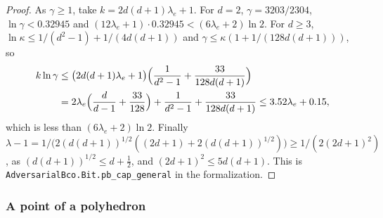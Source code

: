 \documentclass[11pt]{amsart}
\theoremstyle{definition}
\numberwithin{equation}{section}
\begin{document}
\begin{proof}
As $\gamma\ge1$, take $k=2d(d+1)\lambda_e+1$. For $d=2$, $\gamma=3203/2304$, $\ln\gamma<0.32945$ and $(12\lambda_e+1)\cdot0.32945<(6\lambda_e+2)\ln2$. For $d\ge3$, $\ln\kappa\le1/(d^2-1)+1/(4d(d+1))$ and $\gamma\le\kappa(1+1/(128d(d+1)))$, so
\begin{align*}
k\ln\gamma&\le\bigl(2d(d+1)\lambda_e+1\bigr)\Bigl(\frac1{d^2-1}+\frac{33}{128d(d+1)}\Bigr)\\
&=2\lambda_e\Bigl(\frac d{d-1}+\frac{33}{128}\Bigr)+\frac1{d^2-1}+\frac{33}{128d(d+1)}\le3.52\lambda_e+0.15,
\end{align*}
which is less than $(6\lambda_e+2)\ln2$. Finally $\lambda-1=1/\bigl(2(d(d+1))^{1/2}((2d+1)+2(d(d+1))^{1/2})\bigr)\ge1/(2(2d+1)^2)$, as $(d(d+1))^{1/2}\le d+\frac12$, and $(2d+1)^2\le5d(d+1)$.
This is \texttt{AdversarialBco.Bit.pb\_cap\_general} in the formalization.
\end{proof}

\subsubsection{A point of a polyhedron}\label{app:ellf}
\end{document}
